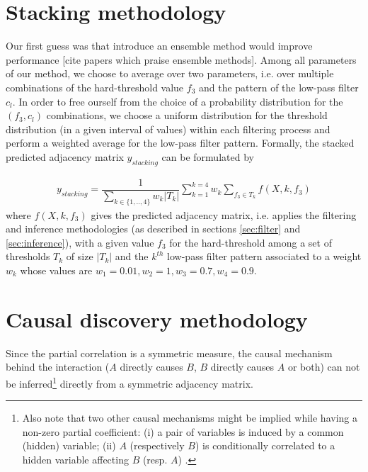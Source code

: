 \documentclass[wcp]{jmlr}
\begin{document}
\section{Stacking methodology}
\label{sec:stacking}

Our first guess was that introduce an ensemble method would improve performance
[cite papers which praise ensemble methods]. Among all parameters of our method,
we choose to average over two parameters, i.e. over multiple combinations of the
hard-threshold value $f_3$ and the pattern of the low-pass filter $c_l$. In order to
free ourself from the choice of a probability distribution for the $(f_3,c_l)$ combinations,
we choose a uniform distribution for the threshold distribution (in a given interval of
values) within each filtering process and perform a weighted average for the low-pass
filter pattern. Formally, the stacked predicted adjacency matrix $y_{stacking}$ can be formulated by

\begin{align}
y_{stacking} =  \dfrac{1}{\sum_{k\in\{1,..,4\}} w_k |T_k|} \sum_{k=1}^{k=4}  w_k \sum_{f_3 \in T_k} f(X, k, f_3)
\end{align}
where $f(X, k, f_3)$ gives the predicted adjacency matrix, i.e. applies the filtering and inference methodologies (as described
in sections \ref{sec:filter} and \ref{sec:inference}), with a  given value $f_3$ for the
hard-threshold among a set of thresholds $T_k$ of size $|T_k|$ and the $k^{th}$ low-pass filter pattern associated
to a weight $w_k$ whose values are $w_1 = 0.01 , w_2 =1, w_3 = 0.7, w_4 = 0.9$.

\section{Causal discovery methodology}
Since the partial correlation is a symmetric measure, the causal mechanism behind the
interaction ($A$ directly causes $B$, $B$ directly causes $A$ or both) can not
be inferred\footnote{Also note that two other causal mechanisms might be
implied while having a non-zero partial coefficient: (i) a pair of variables
is induced by a common (hidden) variable; (ii) $A$ (respectively $B$) is
conditionally correlated to a hidden variable affecting $B$ (resp. $A$)
\cite{de2004discovery}.} directly from a symmetric adjacency matrix.
\end{document}
